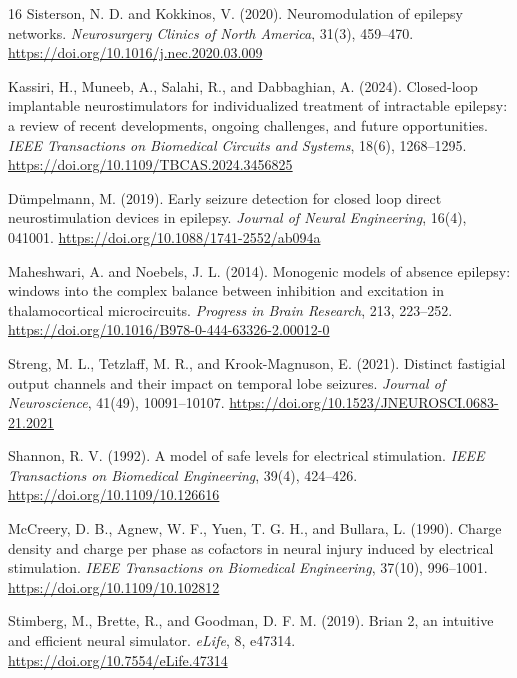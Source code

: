\documentclass[12pt]{article}
\begin{document}
\begin{thebibliography}{16}
Sisterson, N. D. and Kokkinos, V. (2020).
Neuromodulation of epilepsy networks.
\textit{Neurosurgery Clinics of North America}, 31(3), 459--470.
\url{https://doi.org/10.1016/j.nec.2020.03.009}

Kassiri, H., Muneeb, A., Salahi, R., and Dabbaghian, A. (2024).
Closed-loop implantable neurostimulators for individualized treatment of intractable epilepsy: a review of recent developments, ongoing challenges, and future opportunities.
\textit{IEEE Transactions on Biomedical Circuits and Systems}, 18(6), 1268--1295.
\url{https://doi.org/10.1109/TBCAS.2024.3456825}

D\"umpelmann, M. (2019).
Early seizure detection for closed loop direct neurostimulation devices in epilepsy.
\textit{Journal of Neural Engineering}, 16(4), 041001.
\url{https://doi.org/10.1088/1741-2552/ab094a}

Maheshwari, A. and Noebels, J. L. (2014).
Monogenic models of absence epilepsy: windows into the complex balance between inhibition and excitation in thalamocortical microcircuits.
\textit{Progress in Brain Research}, 213, 223--252.
\url{https://doi.org/10.1016/B978-0-444-63326-2.00012-0}

Streng, M. L., Tetzlaff, M. R., and Krook-Magnuson, E. (2021).
Distinct fastigial output channels and their impact on temporal lobe seizures.
\textit{Journal of Neuroscience}, 41(49), 10091--10107.
\url{https://doi.org/10.1523/JNEUROSCI.0683-21.2021}

Shannon, R. V. (1992).
A model of safe levels for electrical stimulation.
\textit{IEEE Transactions on Biomedical Engineering}, 39(4), 424--426.
\url{https://doi.org/10.1109/10.126616}

McCreery, D. B., Agnew, W. F., Yuen, T. G. H., and Bullara, L. (1990).
Charge density and charge per phase as cofactors in neural injury induced by electrical stimulation.
\textit{IEEE Transactions on Biomedical Engineering}, 37(10), 996--1001.
\url{https://doi.org/10.1109/10.102812}

Stimberg, M., Brette, R., and Goodman, D. F. M. (2019).
Brian 2, an intuitive and efficient neural simulator.
\textit{eLife}, 8, e47314.
\url{https://doi.org/10.7554/eLife.47314}

\end{thebibliography}
\end{document}
